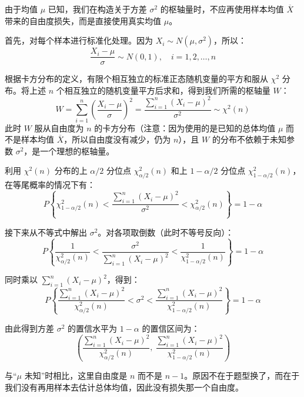 ﻿\documentclass[lang=cn,11pt]{elegantbook}
\begin{document}
\begin{solution}
由于均值 $\mu$ 已知，我们在构造关于方差 $\sigma^2$ 的枢轴量时，不应再使用样本均值 $\overline{X}$ 带来的自由度损失，而是直接使用真实均值 $\mu$。

首先，对每个样本进行标准化处理。因为 $X_i \sim N(\mu, \sigma^2)$，所以：
\begin{equation*}
\frac{X_i-\mu}{\sigma} \sim N(0,1), \quad i=1,2,\dots,n
\end{equation*}

根据卡方分布的定义，有限个相互独立的标准正态随机变量的平方和服从 $\chi^2$ 分布。将上述 $n$ 个相互独立的随机变量平方后求和，得到我们所需的枢轴量 $W$：
\begin{equation*}
W = \sum_{i=1}^n \left(\frac{X_i-\mu}{\sigma}\right)^2 = \frac{\sum_{i=1}^n (X_i-\mu)^2}{\sigma^2} \sim \chi^2(n)
\end{equation*}
此时 $W$ 服从自由度为 $n$ 的卡方分布（注意：因为使用的是已知的总体均值 $\mu$ 而不是样本均值 $\overline{X}$，所以自由度没有减少，仍为 $n$），且 $W$ 的分布不依赖于未知参数 $\sigma^2$，是一个理想的枢轴量。

利用 $\chi^2(n)$ 分布的上 $\alpha/2$ 分位点 $\chi^2_{\alpha/2}(n)$ 和上 $1-\alpha/2$ 分位点 $\chi^2_{1-\alpha/2}(n)$，在等尾概率的情况下有：
\begin{equation*}
P\left\{\chi^2_{1-\alpha/2}(n) < \frac{\sum_{i=1}^n (X_i-\mu)^2}{\sigma^2} < \chi^2_{\alpha/2}(n)\right\}=1-\alpha
\end{equation*}

接下来从不等式中解出 $\sigma^2$。对各项取倒数（此时不等号反向）：
\begin{equation*}
P\left\{\frac{1}{\chi^2_{\alpha/2}(n)} < \frac{\sigma^2}{\sum_{i=1}^n (X_i-\mu)^2} < \frac{1}{\chi^2_{1-\alpha/2}(n)}\right\}=1-\alpha
\end{equation*}

同时乘以 $\sum_{i=1}^n (X_i-\mu)^2$，得到：
\begin{equation*}
P\left\{\frac{\sum_{i=1}^n (X_i-\mu)^2}{\chi^2_{\alpha/2}(n)} < \sigma^2 < \frac{\sum_{i=1}^n (X_i-\mu)^2}{\chi^2_{1-\alpha/2}(n)}\right\}=1-\alpha
\end{equation*}

由此得到方差 $\sigma^2$ 的置信水平为 $1-\alpha$ 的置信区间为：
\begin{equation*}
\left(\frac{\sum_{i=1}^n(X_i-\mu)^2}{\chi^2_{\alpha/2}(n)},\ \frac{\sum_{i=1}^n(X_i-\mu)^2}{\chi^2_{1-\alpha/2}(n)}\right)
\end{equation*}
\begin{note}
与“\(\mu\) 未知”时相比，这里自由度是 \(n\) 而不是 \(n-1\)。原因不在于题型换了，而在于我们没有再用样本去估计总体均值，因此没有损失那一个自由度。
\end{note}
\end{solution}
\end{document}
